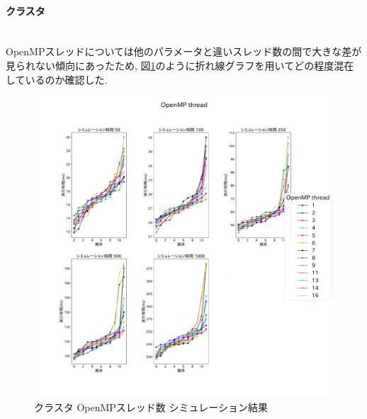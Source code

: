 \paragraph{クラスタ}~\\
OpenMPスレッドについては他のパラメータと違いスレッド数の間で大きな差が見られない傾向にあったため,
図\ref{fig:cluster-openmp}のように折れ線グラフを用いてどの程度混在しているのか確認した.\\

\begin{figure}[htb]
\begin{center}
    \includegraphics[width=14cm]{./images/cluster-OpenMP-thread.pdf}
    \caption{クラスタ OpenMPスレッド数 シミュレーション結果}
    \label{fig:cluster-openmp}
\end{center}
\end{figure}


